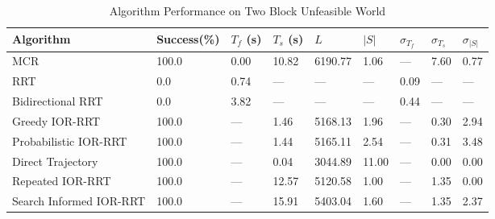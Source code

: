 \begin{table}[h!]
\centering
{}
\caption{Algorithm Performance on Many Obstacles Feasible World}
\label{tab:many_obstacles_feasible_world}
\end{table}

\begin{table}[h!]
\centering
\begin{tabular}{@{}lllllllll@{}}
\toprule
Algorithm & Success(\%) & $T_f$ (s) & $T_s$ (s) & $L$ & $|S|$ & $\sigma_{T_f}$ & $\sigma_{T_s}$ & $\sigma_{|S|}$ \\
\midrule
MCR & 100.0 & 0.00 & 10.82 & 6190.77 & 1.06 & --- & 7.60 & 0.77 \\
RRT & 0.0 & 0.74 & --- & --- & --- & 0.09 & --- & --- \\
Bidirectional RRT & 0.0 & 3.82 & --- & --- & --- & 0.44 & --- & --- \\
Greedy IOR-RRT & 100.0 & --- & 1.46 & 5168.13 & 1.96 & --- & 0.30 & 2.94 \\
Probabilistic IOR-RRT & 100.0 & --- & 1.44 & 5165.11 & 2.54 & --- & 0.31 & 3.48 \\
Direct Trajectory & 100.0 & --- & 0.04 & 3044.89 & 11.00 & --- & 0.00 & 0.00 \\
Repeated IOR-RRT & 100.0 & --- & 12.57 & 5120.58 & 1.00 & --- & 1.35 & 0.00 \\
Search Informed IOR-RRT & 100.0 & --- & 15.91 & 5403.04 & 1.60 & --- & 1.35 & 2.37 \\
\bottomrule
\end{tabular}
\caption{Algorithm Performance on Two Block Unfeasible World}
\label{tab:two_soda_world}
\end{table}


